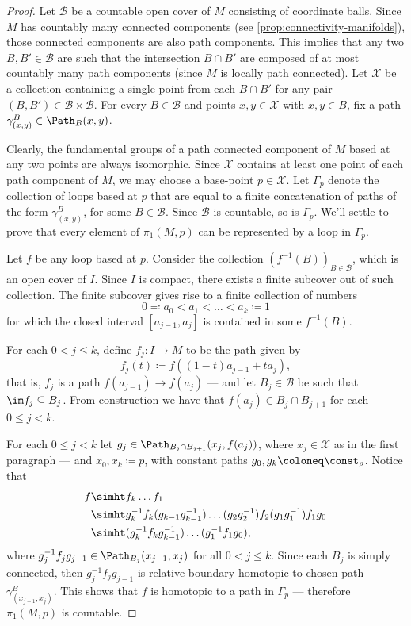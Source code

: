 \begin{proof}
Let \(\mathcal{B}\) be a countable open cover of \(M\) consisting of coordinate
balls. Since \(M\) has countably many connected components (see
\cref{prop:connectivity-manifolds}), those connected components are also path
components. This implies that any two \(B, B' \in \mathcal{B}\) are such that
the intersection \(B \cap B'\) are composed of at most countably many path
components (since \(M\) is locally path connected). Let \(\mathcal{X}\) be a
collection containing a single point from each \(B \cap B'\) for any pair
\((B, B') \in \mathcal{B} \times \mathcal{B}\). For every \(B \in \mathcal{B}\)
and points \(x, y \in \mathcal{X}\) with \(x, y \in B\), fix a path
\(\gamma_{(x, y)}^B \in \Path_B(x, y)\).

Clearly, the fundamental groups of a path connected component of \(M\) based at
any two points are always isomorphic. Since \(\mathcal{X}\) contains at least
one point of each path component of \(M\), we may choose a base-point
\(p \in \mathcal{X}\). Let \(\Gamma_p\) denote the collection of loops based at
\(p\) that are equal to a finite concatenation of paths of the form
\(\gamma_{(x, y)}^B\), for some \(B \in \mathcal{B}\). Since \(\mathcal{B}\) is
countable, so is \(\Gamma_p\). We'll settle to prove that every element of
\(\pi_1(M, p)\) can be represented by a loop in \(\Gamma_p\).

Let \(f\) be any loop based at \(p\). Consider the collection
\((f^{-1}(B))_{B \in \mathcal{B}}\), which is an open cover of \(I\). Since
\(I\) is compact, there exists a finite subcover out of such collection. The
finite subcover gives rise to a finite collection of numbers
\[
0 \eqqcolon a_0 < a_1 < \dots < a_k \coloneq 1
\]
for which the closed interval \([a_{j-1}, a_j]\) is contained in some
\(f^{-1}(B)\).

For each \(0 < j \leq k\), define \(f_j: I \to M\) to be the path given by
\[
f_j(t) \coloneq f((1 - t) a_{j-1} + t a_j),
\]
that is, \(f_j\) is a path \(f(a_{j-1}) \to f(a_j)\) --- and let
\(B_j \in \mathcal{B}\) be such that \(\im f_j \subseteq B_j\). From
construction we have that \(f(a_j) \in B_j \cap B_{j+1}\) for each
\(0 \leq j < k\).

For each \(0 \leq j < k\) let \(g_j \in \Path_{B_j \cap B_{j+1}}(x_j, f(a_j))\),
where \(x_j \in \mathcal{X}\) as in the first paragraph --- and \(x_0, x_k
\coloneq p\), with constant paths \(g_0, g_k \coloneq \const_p\). Notice that
\begin{align*}
f &\simht f_k \dots f_1 \\
  &\simht g_k^{-1} f_k (g_{k-1} g_{k-1}^{-1}) \dots (g_2 g_2^{-1}) f_2 (g_1 g_1^{-1})
    f_1 g_0 \\
  &\simht (g_k^{-1} f_k  g_{k-1}^{-1}) \dots (g_1^{-1} f_1 g_0), \\
\end{align*}
where \(g_j^{-1} f_j g_{j-1} \in \Path_{B_j}(x_{j-1}, x_j)\) for all
\(0 < j \leq k\). Since each \(B_j\) is simply connected, then
\(g_j^{-1} f_j g_{j-1}\) is relative boundary homotopic to chosen path
\(\gamma_{(x_{j-1}, x_j)}^B\). This shows that \(f\) is homotopic to a path in
\(\Gamma_p\) --- therefore \(\pi_1(M, p)\) is countable.
\end{proof}

